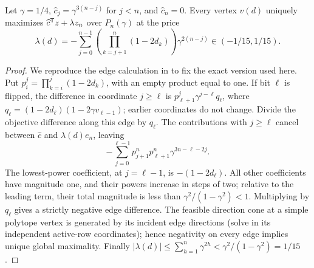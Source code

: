 \begin{lemma}\label{lem:klee-shadow}
Let \(\gamma=1/4\), \(\widehat c_j=\gamma^{3(n-j)}\) for \(j<n\), and
\(\widehat c_n=0\). Every vertex \(v(d)\) uniquely maximizes
\(\widehat c^{\mathsf T} z+\lambda z_n\) over \(P_n(\gamma)\) at the price
\[
 \lambda(d)=-\sum_{j=0}^{n-1}
       \left(\prod_{k=j+1}^n(1-2d_k)\right)\gamma^{2(n-j)}
       \in(-1/15,1/15).
\]
\end{lemma}
\begin{proof}
We reproduce the edge calculation in \citet[Definition~11 and Lemma~12]{GartnerEtAl2013}
to fix the exact version used here. Put
\(p_i^j=\prod_{k=i}^j(1-2d_k)\), with an empty product equal to one.
If bit \(\ell\) is flipped, the difference in coordinate \(j\ge\ell\) is
\(p_{\ell+1}^j\gamma^{j-\ell}q_\ell\), where
\(q_\ell=(1-2d_\ell)(1-2\gamma v_{\ell-1})\); earlier coordinates do not
change. Divide the objective difference along this edge by \(q_\ell\).
The contributions with \(j\ge\ell\) cancel between \(\widehat c\) and
\(\lambda(d)e_n\), leaving
\[
 -\sum_{j=0}^{\ell-1}p_{j+1}^n p_{\ell+1}^n
                  \gamma^{3n-\ell-2j}.
\]
The lowest-power coefficient, at \(j=\ell-1\), is \(-(1-2d_\ell)\).
All other coefficients have magnitude one, and their powers increase in
steps of two; relative to the leading term, their total magnitude is less
than \(\gamma^2/(1-\gamma^2)<1\). Multiplying by \(q_\ell\) gives a strictly
negative edge difference. The feasible direction cone at a simple polytope
vertex is generated by its incident edge directions (solve in its independent
active-row coordinates); hence negativity on every edge implies unique global
maximality. Finally
\(|\lambda(d)|\le\sum_{h=1}^n\gamma^{2h}<\gamma^2/(1-\gamma^2)=1/15\).
\end{proof}

